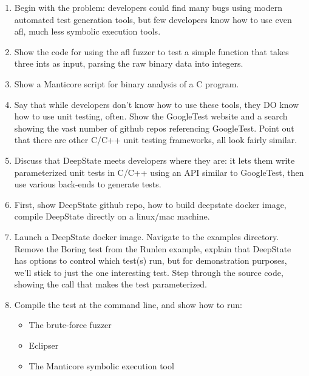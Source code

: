 \documentclass[sigconf]{acmart}
\begin{document}
\begin{enumerate}

\item

  Begin with the problem:  developers could find many bugs using modern automated test generation tools, but few developers know how to use even afl, much less symbolic execution tools.

\item  Show the code for using the afl fuzzer to test a simple function that takes three ints as input, parsing the raw binary data into integers.

\item Show a Manticore script for binary analysis of a C program.

\item Say that while developers don't know how to use these tools, they DO know how to use unit testing, often.  Show the GoogleTest website and a search showing the vast number of github repos referencing GoogleTest.  Point out that there are other C/C++ unit testing frameworks, all look fairly similar.

\item Discuss that DeepState meets developers where they are:  it lets them write parameterized unit tests in C/C++ using an API similar to GoogleTest, then use various back-ends to generate tests.
  
\item

  First, show DeepState github repo, how to build deepstate docker image, compile DeepState directly on a linux/mac machine.

\item

  Launch a DeepState docker image.  Navigate to the examples directory.  Remove the Boring test from the Runlen example, explain that DeepState has options to control which test(s) run, but for demonstration purposes, we'll stick to just the one interesting test.  Step through the source code, showing the call that makes the test parameterized.

\item Compile the test at the command line, and show how to run:

  \begin{itemize}
  \item The brute-force fuzzer
  \item Eclipser
  \item The Manticore symbolic execution tool
  \end{itemize}


\end{enumerate}
\end{document}
